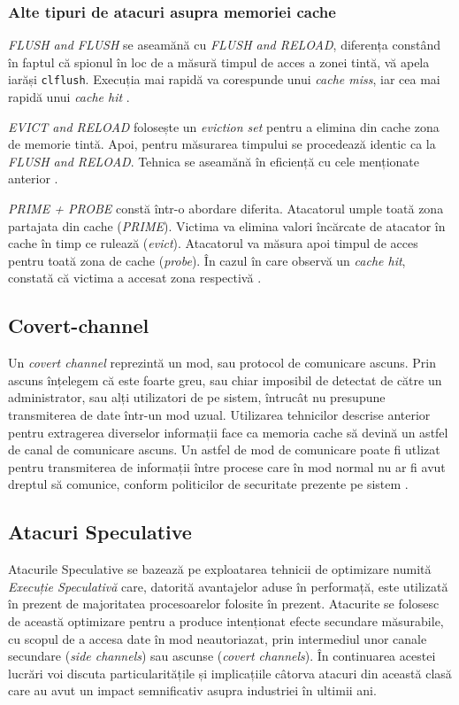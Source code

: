 \subsubsection{Alte tipuri de atacuri asupra memoriei cache}

\emph{FLUSH and FLUSH} se aseamănă cu \emph{FLUSH and RELOAD}, diferența 
constând în faptul că spionul în loc de a măsură timpul de acces a zonei
tintă, vă apela iarăși \texttt{clflush}. Execuția mai rapidă va corespunde
unui \emph{cache miss}, iar cea mai rapidă unui \emph{cache hit} \cite{cache_attacks}.

\emph{EVICT and RELOAD} folosește un \emph{eviction set} pentru a elimina din
cache zona de memorie tintă. Apoi, pentru măsurarea timpului se procedează 
identic ca la \emph{FLUSH and RELOAD}. Tehnica se aseamănă în eficiență cu 
cele menționate anterior \cite{cache_attacks}.

\emph{PRIME + PROBE} constă într-o abordare diferita. Atacatorul umple toată
zona partajata din cache (\emph{PRIME}). Victima va elimina valori încărcate
de atacator în cache în timp ce rulează (\emph{evict}). Atacatorul va măsura 
apoi timpul de acces pentru toată zona de cache (\emph{probe}). În cazul în care observă
un \emph{cache hit}, constată că victima a accesat zona respectivă \cite{cache_attacks}.

\subsection{Covert-channel}

Un \emph{covert channel} reprezintă un mod, sau protocol de comunicare ascuns.
Prin ascuns înțelegem că este foarte greu, sau chiar imposibil de detectat de
către un administrator, sau alți utilizatori de pe sistem, întrucât nu
presupune transmiterea de date într-un mod uzual. Utilizarea tehnicilor
descrise anterior pentru extragerea diverselor informații face ca memoria cache
să devină un astfel de canal de comunicare ascuns. Un astfel de mod de comunicare
poate fi utlizat pentru transmiterea de informații între procese care în mod normal
nu ar fi avut dreptul să comunice, conform politicilor de securitate prezente pe 
sistem \cite{covert_channel}. 

\subsection{Atacuri Speculative}

Atacurile Speculative se bazează pe exploatarea tehnicii de optimizare numită
\emph{Execuție Speculativă} care, datorită avantajelor aduse în performață,
este utilizată în prezent de majoritatea procesoarelor folosite în prezent.
Atacurite se folosesc de această optimizare pentru a produce intenționat efecte
secundare măsurabile, cu scopul de a accesa date în mod neautoriazat, prin
intermediul unor canale secundare (\emph{side channels}) sau ascunse
(\emph{covert channels}). În continuarea acestei lucrări voi discuta
particularitățile și implicațiile câtorva atacuri din această clasă care au
avut un impact semnificativ asupra industriei în ultimii ani.

